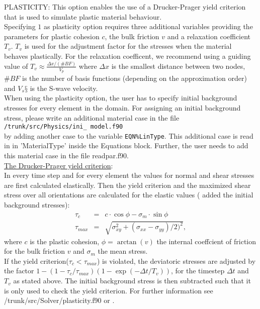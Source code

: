 \documentclass[12pt,twoside]{article}
\begin{document}
\noindent
\hypertarget{plast}{PLASTICITY}: 
This option enables the use of a Drucker-Prager yield criterion that is used to simulate plastic material behaviour. \\
Specifying $1$ as plasticity option requires three additional variables providing the parameters for plastic cohesion $c$, the bulk friction $v$ and a relaxation coefficient $T_v$. $T_v$ is used for the adjustment factor for the stresses when the material behaves plastically. For the relaxation coefficent, we recommend using a guiding value of $T_v\approx \frac{\Delta x / (\# BF)}{V_p}$ where $\Delta x$ is the smallest distance between two nodes, $\# BF$ is the number of basis functions (depending on the approximation order) and $V_s§$ is the S-wave velocity. \\
When using the plasticity option, the user has to specify initial background stresses for every element in the domain.
For assigning an initial background stress, please write an additional material case in the file\\
 {\tt /trunk/src/Physics/ini\_ model.f90} \\
 by adding another case to the variable {\tt EQN\%LinType}. This additional case is read in in 'MaterialType' inside the Equations block. Further, the user needs to add this material case  in the file readpar.f90.\\
\noindent \uline{The Drucker-Prager yield criterion}: \\
In every time step and for every element the values for normal and shear stresses are first calculated elastically. Then the yield criterion and the maximized shear stress over all orientations are calculated for the elastic values ( added the initial background stresses):
\begin{eqnarray*}
\tau_c &=& c\cdot \cos \phi-\sigma_m\cdot \sin \phi \\
\tau_{max} &=& \sqrt{\sigma^2_{xy}+(\sigma_{xx}-\sigma_{yy})/2)^2},
\end{eqnarray*} 
where $c$ is the plastic cohesion, $\phi=\arctan(v)$ the internal coeffcient of friction for the bulk friction $v$ and $\sigma_m$ the mean stress.\\
If the yield criterion($\tau_c < \tau_{max}$) is violated, the deviatoric stresses are adjusted by the factor $1-(1-\tau_c/\tau_{max})(1-\exp(-\Delta t /T_v))$, for the timestep $\Delta t$ and $T_v$ as stated above. The initial background stress is then subtracted such that it is only used to check the yield criterion.
For further information see /trunk/src/Solver/plasticity.f90 or \cite{Andrews2005}.
\end{document}
